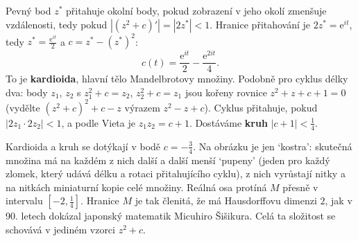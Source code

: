 Pevný bod $z^\ast$ přitahuje okolní body, pokud zobrazení v jeho okolí zmenšuje vzdálenosti, tedy pokud $|(z^2 + c)'| = |2z^\ast| < 1$. Hranice přitahování je $2z^\ast = \mathrm{e}^{it}$, tedy $z^\ast = \frac{\mathrm{e}^{it}}{2}$ a $c = z^\ast - {(z^\ast)}^2$:
\begin{equation*}
  c(t) = \frac{\mathrm{e}^{it}}{2} - \frac{\mathrm{e}^{2it}}{4}.
\end{equation*}
To je \textbf{kardioida}, hlavní tělo Mandelbrotovy množiny. Podobně pro cyklus délky dva: body $z_1$, $z_2$ s $z_1^2 + c = z_2$, $z_2^2 + c = z_1$ jsou kořeny rovnice $z^2 + z + c + 1 = 0$ (vydělte ${(z^2 + c)}^2 + c - z$ výrazem $z^2 - z + c$). Cyklus přitahuje, pokud $|2z_1\cdot 2z_2| < 1$, a podle Vieta je $z_1z_2 = c + 1$. Dostáváme \textbf{kruh} $|c + 1| < \frac{1}{4}$.

\begin{center}
\end{center}

Kardioida a kruh se dotýkají v bodě $c = -\frac{3}{4}$. Na obrázku je jen `kostra': skutečná množina má na každém z nich další a další menší `pupeny' (jeden pro každý zlomek, který udává délku a rotaci přitahujícího cyklu), z nich vyrůstají nitky a na nitkách miniaturní kopie celé množiny. Reálná osa protíná $M$ přesně v intervalu $[-2, \frac{1}{4}]$. Hranice $M$ je tak členitá, že má Hausdorffovu dimenzi $2$, jak v 90. letech dokázal japonský matematik Micuhiro Šišikura. Celá ta složitost se schovává v jediném vzorci $z^2 + c$.

